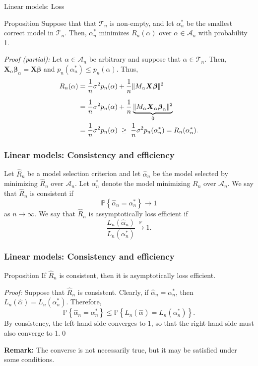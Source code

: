 \documentclass{beamer}
\newcommand{\0}{\emptyset}
\newcommand{\prob}{\mathbb{P}}
\newcommand{\paren}[1]{\left(#1 \right)}
\newcommand{\set}[1]{\left\{ #1 \right\}}
\newcommand{\norm}[1]{|\hspace{-1pt}|#1 |\hspace{-1pt}|}
\newcommand{\normsq}[1]{\norm{#1}^{2}}
\newcommand{\Acal}{\mathcal{A}_{n}}
\newcommand{\Tcal}{\mathcal{T}_{n}}
\newcommand{\X}{\boldsymbol{X}}
\newcommand{\bbeta}{\boldsymbol{\beta}}
\newcommand{\Loss}[1]{L_{n}\paren{#1}}
\newcommand{\alphahat}[1]{\hat{\alpha}^{#1}}
\newcommand{\1}{\mathmybb{1}}
\begin{document}
\begin{frame}{Linear models: Loss}
  \begin{block}{Proposition}
    Suppose that that \(\Tcal\) is non-empty, and let \(\alpha^{*}_{n}\) be the smallest correct model in \(\Tcal\). Then, \(\alpha^{*}_{n}\) minimizes \(R_{n}(\alpha)\) over \(\alpha\in\Acal\) with probability 1.
  \end{block}

  \textit{Proof (partial): }
  Let \(\alpha\in\Acal\) be arbitrary and suppose that \(\alpha\in\Tcal\). Then, \(\X_{\alpha}\bbeta_{\alpha} = \X\bbeta\) and \(p_{n}(\alpha_{n}^{*})\leq p_{n}(\alpha)\). Thus,
    \begin{align*}
        R_{n}(\alpha) &= \frac{1}{n}\sigma^{2}p_{n}(\alpha) + \frac{1}{n}\normsq{M_{\alpha}\X\bbeta}\\[2mm]
        &= \frac{1}{n} \sigma^{2}p_{n}(\alpha) + \frac{1}{n}\underbrace{\normsq{M_{\alpha}\X_{\alpha}\bbeta_{\alpha}}}_{0}\\
        &= \frac{1}{n}\sigma^{2}p_{n}(\alpha)\; \geq \; \frac{1}{n}\sigma^{2}p_{n}(\alpha_{n}^{*}) = R_{n}(\alpha_{n}^{*}).
    \end{align*}
\end{frame}

\begin{frame}
  \frametitle{Linear models: Consistency and efficiency}
  Let \(\hat{R}_{n}\) be a model selection criterion and let \(\alphahat{}_{n}\) be the model selected by minimizing \(\hat{R}_{n}\) over \(\Acal\). Let \(\alpha^{*}_{n}\) denote the model minimizing \(R_{n}\) over \(\Acal\). We say that \(\hat{R}_{n}\) is \alert{consistent} if 
  \[\prob\set{\alphahat{}_{n} = \alpha^{*}_{n}}\to 1\]
  as \(n\to\infty\). We say that \(\hat{R}_{n}\) is \alert{assymptotically loss efficient} if 
  \[\frac{L_{n}(\alphahat{}_{n})}{L_{n}(\alpha^{*}_{n})}\xrightarrow{\prob} 1.\]
  
\end{frame}

\begin{frame}
  \frametitle{Linear models: Consistency and efficiency}
  \begin{block}{Proposition}
    If \(\hat{R}_{n}\) is consistent, then it is asymptotically loss efficient.
  \end{block}

    \textit{Proof: } Suppose that \(\hat{R}_{n}\) is consistent. Clearly, if \(\alphahat{}_{n} = \alpha^{*}_{n}\), then \(\Loss{\alphahat{}} = \Loss{\alpha^{*}_{n}}\). Therefore, 
    \[\prob\set{\alphahat{}_{n} = \alpha^{*}_{n}}\leq \prob\set{\Loss{\alphahat{}} = \Loss{\alpha^{*}_{n}}}.\]
    By consistency, the left-hand side converges to 1, so that the right-hand side must also converge to 1.\qed{}

    \textbf{Remark: }The converse is not necessarily true, but it may be satisfied under some conditions.
\end{frame}
\end{document}
